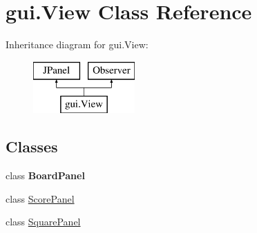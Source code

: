 \hypertarget{classgui_1_1_view}{}\section{gui.\+View Class Reference}
\label{classgui_1_1_view}
Inheritance diagram for gui.\+View\+:\begin{figure}[H]
\begin{center}
\leavevmode
\includegraphics[height=2.000000cm]{classgui_1_1_view}
\end{center}
\end{figure}
\subsection*{Classes}
\begin{DoxyCompactItemize}
\item 
class {\bfseries Board\+Panel}
\item 
class \mbox{\hyperlink{classgui_1_1_view_1_1_score_panel}{Score\+Panel}}
\item 
class \mbox{\hyperlink{classgui_1_1_view_1_1_square_panel}{Square\+Panel}}
\end{DoxyCompactItemize}
